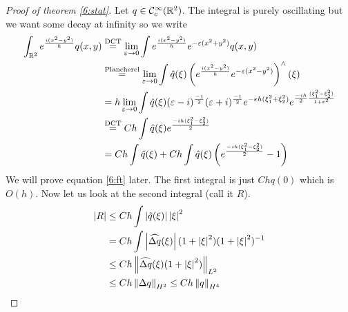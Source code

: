 \begin{proof}[Proof of theorem \ref{6:stat}]
  Let $q \in \mathcal{C}_c^\infty(\mathbb{R}^2)$.
  The integral is purely oscillating but we want some decay at infinity so we write
  \begin{align}
    \int_{\mathbb{R}^2} e^\frac{i(x^2-y^2)}h q(x,y) &\overset{\text{DCT}}= \lim_{\varepsilon\to 0} \int e^\frac{i(x^2-y^2)}h e^{-\varepsilon(x^2+y^2)} q(x,y) \nonumber \\
    &\overset{\text{Plancherel}}= \lim_{\varepsilon\to 0} \int \hat q(\xi) \left( e^\frac{i(x^2-y^2)}h e^{-\varepsilon(x^2-y^2)} \right)^\wedge (\xi) \nonumber \\
    &= h \lim_{\varepsilon\to 0} \int \hat q(\xi) (\varepsilon-i)^\frac{-1}2 (\varepsilon+i)^\frac{-1}2 e^{-\varepsilon h(\xi_1^2+\xi_2^2)} e^{\frac{-ih}2 \frac{(\xi_1^2-\xi_2^2)}{1+\varepsilon^2}} \label{6:ft} \\
    &\overset{\text{DCT}}= Ch \int \hat q(\xi) e^\frac{-ih(\xi_1^2-\xi_2^2)}2 \nonumber \\
    &= Ch \int \hat q(\xi) + Ch \int \hat q(\xi) \left( e^\frac{-ih(\xi_1^2-\xi_2^2)}2 -1 \right) \nonumber 
  \end{align}
  We will prove equation \ref{6:ft} later.
  The first integral is just $Chq(0)$ which is $O(h)$.
  Now let us look at the second integral (call it $R$).
  \begin{align*}
    \left\lvert R \right\rvert &\leq Ch \int \left\lvert \hat q(\xi) \right\rvert \left\lvert \xi \right\rvert^2 \\
    &= Ch \int \left\lvert \widehat{\Delta q}(\xi) \right\rvert (1+\left\lvert \xi \right\rvert^2)(1+\left\lvert \xi \right\rvert^2)^{-1} \\
    &\leq Ch \left\lVert \widehat{\Delta q}(\xi)(1+\left\lvert \xi \right\rvert^2) \right\rVert_{L^2} \\
    &\leq Ch \left\lVert \Delta q \right\rVert_{H^2} \leq Ch\left\lVert q \right\rVert_{H^4} \qedhere
  \end{align*}
\end{proof}
